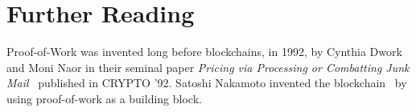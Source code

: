 
\section*{Further Reading}

Proof-of-Work was invented long before blockchains, in 1992, by Cynthia Dwork and Moni Naor
in their seminal paper \emph{Pricing via Processing or Combatting Junk Mail}~\cite{pow} published
in CRYPTO '92. Satoshi Nakamoto invented the blockchain~\cite{bitcoin} by using proof-of-work as a
building block.
